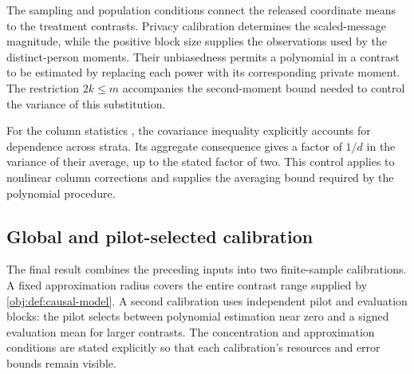 The sampling and population conditions connect the released coordinate means to the treatment contrasts. Privacy calibration determines the scaled-message magnitude, while the positive block size supplies the observations used by the distinct-person moments. Their unbiasedness permits a polynomial in a contrast to be estimated by replacing each power with its corresponding private moment. The restriction \(2k\le m\) accompanies the second-moment bound needed to control the variance of this substitution.

For the column statistics , the covariance inequality explicitly accounts for dependence across strata. Its aggregate consequence gives a factor of \(1/d\) in the variance of their average, up to the stated factor of two. This control applies to nonlinear column corrections and supplies the averaging bound required by the polynomial procedure.

\subsection{Global and pilot-selected calibration}

The final result combines the preceding inputs into two finite-sample calibrations. A fixed approximation radius covers the entire contrast range supplied by \cref{obj:def:causal-model}. A second calibration uses independent pilot and evaluation blocks: the pilot selects between polynomial estimation near zero and a signed evaluation mean for larger contrasts. The concentration and approximation conditions are stated explicitly so that each calibration's resources and error bounds remain visible.

